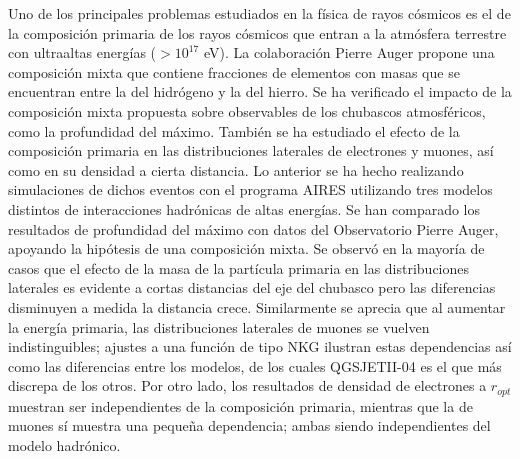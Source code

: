 

Uno de los principales problemas estudiados en la física de rayos cósmicos es el de la composición primaria de los rayos cósmicos que entran a la atmósfera terrestre con ultraaltas energías ($>10^{17}$ eV). La colaboración Pierre Auger propone una composición mixta que contiene fracciones de elementos con masas que se encuentran entre la del hidrógeno y la del hierro. Se ha verificado el impacto de la composición mixta propuesta sobre observables de los chubascos atmosféricos, como la profundidad del máximo. También se ha estudiado el efecto de la composición primaria en las distribuciones laterales de electrones y muones, así como en su densidad a cierta distancia. Lo anterior se ha hecho realizando simulaciones de dichos eventos con el programa AIRES utilizando tres modelos distintos de interacciones hadrónicas de altas energías. Se han comparado los resultados de profundidad del máximo con datos del Observatorio Pierre Auger, apoyando la hipótesis de una composición mixta. Se observó en la mayoría de casos que el efecto de la masa de la partícula primaria en las distribuciones laterales es evidente a cortas distancias del eje del chubasco pero las diferencias disminuyen a medida la distancia crece. Similarmente se aprecia que al aumentar la energía primaria, las distribuciones laterales de muones se vuelven indistinguibles; ajustes a una función de tipo NKG ilustran estas dependencias así como las diferencias entre los modelos, de los cuales QGSJETII-04 es el que más discrepa de los otros. Por otro lado, los resultados de densidad de electrones a $r_{opt}$ muestran ser independientes de la composición primaria, mientras que la de muones sí muestra una pequeña dependencia; ambas siendo independientes del modelo hadrónico. 

 
\singlespacing